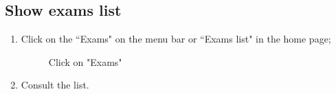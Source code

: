\documentclass[ManualeUtente]{subfiles}
\begin{document}
\subsection{Show exams list}
\begin{enumerate}
	\item Click on the \textquotedblleft Exams" on the menu bar or \textquotedblleft Exams list" in the home page;
	\begin{figure}[H]
		\centering
		\caption{Click on "Exams"}
		\label{fig:Click on "Exams"}
	\end{figure}
	\item Consult the list.
\end{enumerate}
\end{document}
